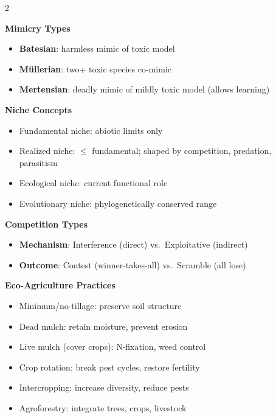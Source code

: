 \documentclass[11pt]{article}
\begin{document}
\begin{multicols}{2}
\columnbreak

\textbf{\color{sectioncolor}Mimicry Types}

\begin{itemize}[noitemsep,leftmargin=*]
  \item \textbf{Batesian}: harmless mimic of toxic model
  \item \textbf{M\"{u}llerian}: two+ toxic species co-mimic
  \item \textbf{Mertensian}: deadly mimic of mildly toxic model (allows learning)
\end{itemize}

\vspace{0.3cm}

\textbf{\color{sectioncolor}Niche Concepts}

\begin{itemize}[noitemsep,leftmargin=*]
  \item Fundamental niche: abiotic limits only
  \item Realized niche: $\leq$ fundamental; shaped by competition, predation, parasitism
  \item Ecological niche: current functional role
  \item Evolutionary niche: phylogenetically conserved range
\end{itemize}

\vspace{0.3cm}

\textbf{\color{sectioncolor}Competition Types}

\begin{itemize}[noitemsep,leftmargin=*]
  \item \textbf{Mechanism}: Interference (direct) vs.\ Exploitative (indirect)
  \item \textbf{Outcome}: Contest (winner-takes-all) vs.\ Scramble (all lose)
\end{itemize}

\vspace{0.3cm}

\textbf{\color{sectioncolor}Eco-Agriculture Practices}

\begin{itemize}[noitemsep,leftmargin=*]
  \item Minimum/no-tillage: preserve soil structure
  \item Dead mulch: retain moisture, prevent erosion
  \item Live mulch (cover crops): N-fixation, weed control
  \item Crop rotation: break pest cycles, restore fertility
  \item Intercropping: increase diversity, reduce pests
  \item Agroforestry: integrate trees, crops, livestock
\end{itemize}

\end{multicols}
\end{document}
